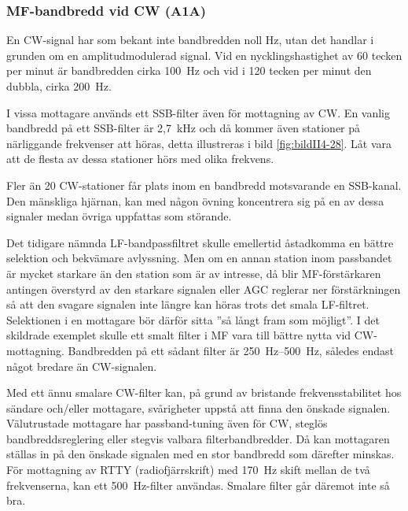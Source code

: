 \subsubsection{MF-bandbredd vid CW (A1A)}

En CW-signal har som bekant inte bandbredden noll Hz, utan det handlar
i grunden om en amplitudmodulerad signal.
Vid en nycklingshastighet av 60 tecken per minut är bandbredden cirka 100~Hz
och vid i 120 tecken per minut den dubbla, cirka \SI{200}{\hertz}.

I vissa mottagare används ett SSB-filter även för mottagning av CW.
En vanlig bandbredd på ett SSB-filter är 2,7~kHz och då kommer även
stationer på närliggande frekvenser att höras, detta illustreras i bild
\ref{fig:bildII4-28}.
Låt vara att de flesta av dessa stationer hörs med olika frekvens.


Fler än 20 CW-stationer får plats inom en bandbredd motsvarande en SSB-kanal.
Den mänskliga hjärnan, kan med någon övning koncentrera sig på en av dessa
signaler medan övriga uppfattas som störande.

Det tidigare nämnda LF-bandpassfiltret skulle emellertid åstadkomma en
bättre selektion och bekvämare avlyssning.
Men om en annan station inom passbandet är mycket starkare än den station
som är av intresse, då blir MF-förstärkaren antingen överstyrd av den
starkare signalen eller AGC reglerar ner förstärkningen så att den svagare
signalen inte längre kan höras trots det smala LF-filtret.
Selektionen i en mottagare bör därför sitta ''så långt fram som möjligt''.
I det skildrade exemplet skulle ett smalt filter i MF vara till bättre nytta
vid CW-mottagning.
Bandbredden på ett sådant filter är \SIrange{250}{500}{\hertz}, således endast
något bredare än CW-signalen.

Med ett ännu smalare CW-filter kan, på grund av bristande frekvensstabilitet hos
sändare och/eller mottagare, svårigheter uppstå att finna den önskade signalen.
Välutrustade mottagare har passband-tuning även för CW, steglös
bandbreddsreglering eller stegvis valbara filterbandbredder.
Då kan mottagaren ställas in på den önskade signalen med en stor bandbredd
som därefter minskas.
För mottagning av RTTY (radiofjärrskrift) med \SI{170}{\hertz} skift mellan de
två frekvenserna, kan ett \SI{500}{\hertz}-filter användas.
Smalare filter går däremot inte så bra.

